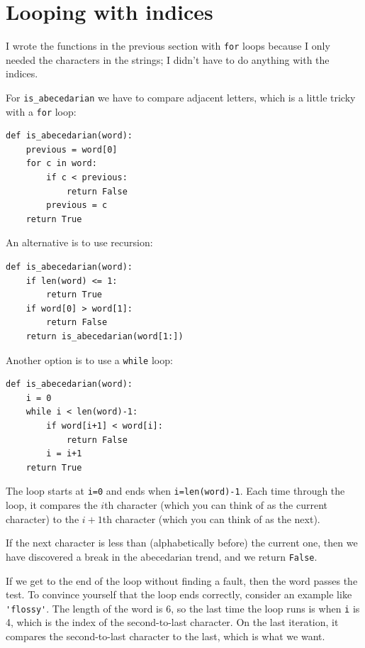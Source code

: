 \documentclass[10pt]{book}
\begin{document}
\section{Looping with indices}

I wrote the functions in the previous section with {\tt for}
loops because I only needed the characters in the strings; I didn't
have to do anything with the indices.

For \verb"is_abecedarian" we have to compare adjacent letters,
which is a little tricky with a {\tt for} loop:

\begin{verbatim}
def is_abecedarian(word):
    previous = word[0]
    for c in word:
        if c < previous:
            return False
        previous = c
    return True
\end{verbatim}


An alternative is to
use recursion:

\begin{verbatim}
def is_abecedarian(word):
    if len(word) <= 1:
        return True
    if word[0] > word[1]:
        return False
    return is_abecedarian(word[1:])
\end{verbatim}

Another option is to use a {\tt while} loop:

\begin{verbatim}
def is_abecedarian(word):
    i = 0
    while i < len(word)-1:
        if word[i+1] < word[i]:
            return False
        i = i+1
    return True
\end{verbatim}
%
The loop starts at {\tt i=0} and ends when {\tt i=len(word)-1}.  Each
time through the loop, it compares the $i$th character (which you can
think of as the current character) to the $i+1$th character (which you
can think of as the next).

If the next character is less than (alphabetically before) the current
one, then we have discovered a break in the abecedarian trend, and
we return {\tt False}.

If we get to the end of the loop without finding a fault, then the
word passes the test.  To convince yourself that the loop ends
correctly, consider an example like \verb"'flossy'".  The
length of the word is 6, so
the last time the loop runs is when {\tt i} is 4, which is the
index of the second-to-last character.  On the last iteration,
it compares the second-to-last character to the last, which is
what we want.
\end{document}
